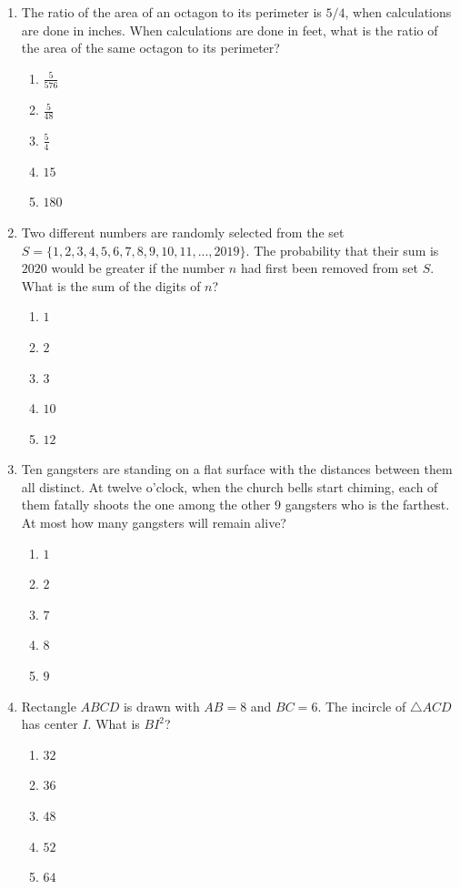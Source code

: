 \documentclass[12pt]{scrartcl}
\begin{document}
\begin{enumerate}
\item The ratio of the area of an octagon to its perimeter is $5/4$, when calculations are done in inches. When calculations are done in feet, what is the ratio of the area of the same octagon to its perimeter?
\begin{enumerate}
    \item $\frac{5}{576}$
    \item $\frac{5}{48}$
    \item $\frac{5}{4}$
    \item $15$
    \item $180$
\end{enumerate}

\item Two different numbers are randomly selected from the set $S=\{1,2,3,4,5,6,7,8,9,10,11,...,2019\}$. The probability that their sum is $2020$ would be greater if the number $n$ had first been removed from set $S$. What is the sum of the digits of $n$?
\begin{enumerate}
    \item $1$
    \item $2$
    \item $3$
    \item $10$
    \item $12$
\end{enumerate}

\item Ten gangsters are standing on a flat surface with the distances between them all distinct. At twelve o'clock, when the church bells start chiming, each of them fatally shoots the one among the other $9$ gangsters who is the farthest. At most how many gangsters will remain alive?
\begin{enumerate}
    \item $1$
    \item $2$
    \item $7$
    \item $8$
    \item $9$
\end{enumerate}

\item Rectangle $ABCD$ is drawn with $AB=8$ and $BC=6$. The incircle of $\triangle ACD$ has center $I$. What is $BI^{2}$?
\begin{enumerate}
    \item $32$
    \item $36$
    \item $48$
    \item $52$
    \item $64$
\end{enumerate}


\end{enumerate}
\end{document}
